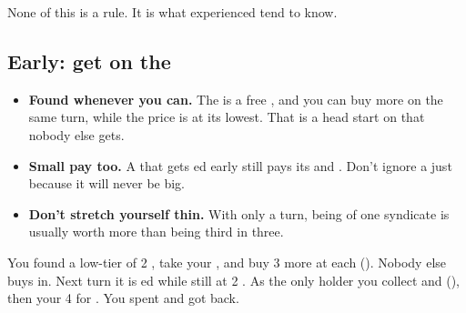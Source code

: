 None of this is a rule. It is what experienced  tend to know.

\subsection{Early: get  on the }
\begin{itemize}
  \item \textbf{Found  whenever you can.} The  is a free , and you can buy  more on the same
    turn, while the price is at its lowest. That is a head start on  that nobody else gets.
  \item \textbf{Small  pay too.} A  that gets ed early still pays its  and .
    Don't ignore a  just because it will never be big.
  \item \textbf{Don't stretch yourself thin.} With only   a turn, being  of one syndicate is usually worth
    more than being third in three.
\end{itemize}

\begin{example}
You found a low-tier  of 2 , take your , and buy 3 more  at  each ().
Nobody else buys in. Next turn it is ed while still at 2 . As the only holder you collect  and
 (), then  your 4  for . You spent  and got  back.
\end{example}

